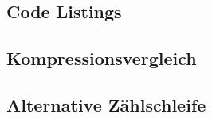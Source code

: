 \documentclass[12pt]{article}
\begin{document}


\newpage

\begin{appendix}



\section{Code Listings}
\subsection{Kompressionsvergleich}
\label{listing:compression}
\lstset{language=bash}


\subsection{Alternative Zählschleife}
\label{listing:zahlen2}

\lstset{language=bash}



\end{appendix}
\end{document}
